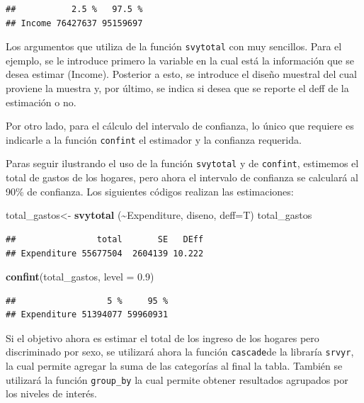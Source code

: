 \documentclass[
  12pt,
]{book}
\newenvironment{Shaded}{\begin{snugshade}}{\end{snugshade}}
\newcommand{\AttributeTok}[1]{\textcolor[rgb]{0.13,0.29,0.53}{#1}}
\newcommand{\FloatTok}[1]{\textcolor[rgb]{0.00,0.00,0.81}{#1}}
\newcommand{\FunctionTok}[1]{\textcolor[rgb]{0.13,0.29,0.53}{\textbf{#1}}}
\newcommand{\NormalTok}[1]{#1}
\newcommand{\OtherTok}[1]{\textcolor[rgb]{0.56,0.35,0.01}{#1}}
\newcommand{\SpecialCharTok}[1]{\textcolor[rgb]{0.81,0.36,0.00}{\textbf{#1}}}
\begin{document}
\begin{verbatim}
##           2.5 %   97.5 %
## Income 76427637 95159697
\end{verbatim}

Los argumentos que utiliza de la función \texttt{svytotal} con muy sencillos. Para el ejemplo, se le introduce primero la variable en la cual está la información que se desea estimar (Income). Posterior a esto, se introduce el diseño muestral del cual proviene la muestra y, por último, se indica si desea que se reporte el deff de la estimación o no.

Por otro lado, para el cálculo del intervalo de confianza, lo único que requiere es indicarle a la función \texttt{confint} el estimador y la confianza requerida.

Paras seguir ilustrando el uso de la función \texttt{svytotal} y de \texttt{confint}, estimemos el total de gastos de los hogares, pero ahora el intervalo de confianza se calculará al 90\% de confianza. Los siguientes códigos realizan las estimaciones:

\begin{Shaded}
\begin{Highlighting}[]
\NormalTok{total\_gastos}\OtherTok{\textless{}{-}} \FunctionTok{svytotal}\NormalTok{ (}\SpecialCharTok{\textasciitilde{}}\NormalTok{Expenditure, diseno, }\AttributeTok{deff=}\NormalTok{T)}
\NormalTok{total\_gastos}
\end{Highlighting}
\end{Shaded}

\begin{verbatim}
##                total       SE   DEff
## Expenditure 55677504  2604139 10.222
\end{verbatim}

\begin{Shaded}
\begin{Highlighting}[]
\FunctionTok{confint}\NormalTok{(total\_gastos, }\AttributeTok{level =} \FloatTok{0.9}\NormalTok{)}
\end{Highlighting}
\end{Shaded}

\begin{verbatim}
##                  5 %     95 %
## Expenditure 51394077 59960931
\end{verbatim}

Si el objetivo ahora es estimar el total de los ingreso de los hogares pero discriminado por sexo, se utilizará ahora la función \texttt{cascade}de la libraría \texttt{srvyr}, la cual permite agregar
la suma de las categorías al final la tabla. También se utilizará la función \texttt{group\_by} la cual permite obtener resultados agrupados por los niveles de interés.
\end{document}

